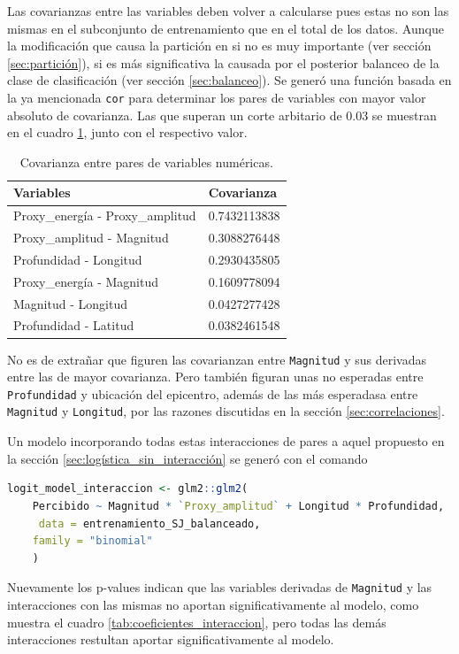\documentclass[a4paper]{report}
\begin{document}
Las covarianzas entre las variables deben volver a calcularse pues estas no son las mismas en el subconjunto de entrenamiento que en el total de los datos.
Aunque la modificación que causa la partición en si no es muy importante (ver sección \ref{sec:partición}), si es más significativa la causada por el posterior balanceo de la clase de clasificación (ver sección \ref{sec:balanceo}).
Se generó una función basada en la ya mencionada \lstinline[language=R]{cor} para determinar los pares de variables con mayor valor absoluto de covarianza.
Las que superan un corte arbitario de \num{0.03} se muestran en el cuadro \ref{tab:covarianza}, junto con el respectivo valor.

\begin{table}[!ht]
	\centering
	\begin{tabular}{ll}
		\toprule
		Variables & Covarianza\\
		\midrule
		Proxy\_energía - Proxy\_amplitud & 0.7432113838\\
		Proxy\_amplitud - Magnitud & 0.3088276448\\
		Profundidad - Longitud & 0.2930435805\\
		Proxy\_energía - Magnitud & 0.1609778094\\
		Magnitud - Longitud & 0.0427277428\\
		Profundidad - Latitud & 0.0382461548\\
		\bottomrule
	\end{tabular}
	\caption{Covarianza entre pares de variables numéricas.}
	\label{tab:covarianza}
\end{table}
No es de extrañar que figuren las covarianzan entre \verb'Magnitud' y sus derivadas entre las de mayor covarianza.
Pero también figuran unas no esperadas entre \verb'Profundidad' y ubicación del epicentro, además de las más esperadasa entre \verb'Magnitud' y \verb'Longitud', por las razones discutidas en la sección \ref{sec:correlaciones}.

Un modelo incorporando todas estas interacciones de pares a aquel propuesto en la sección \ref{sec:logística_sin_interacción} se generó con el comando
\begin{lstlisting}[language=R, breaklines=true]
logit_model_interaccion <- glm2::glm2(
	Percibido ~ Magnitud * `Proxy_amplitud` + Longitud * Profundidad,
	 data = entrenamiento_SJ_balanceado,
	family = "binomial"
	)
\end{lstlisting}

Nuevamente los p-values indican que las variables derivadas de \verb'Magnitud' y las interacciones con las mismas no aportan significativamente al modelo, como muestra el cuadro \ref{tab:coeficientes_interaccion}, pero todas las demás interacciones restultan aportar significativamente al modelo.
\end{document}
